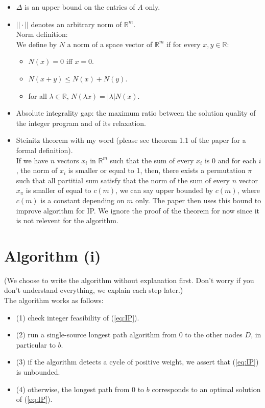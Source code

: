 \documentclass[12pt]{article}
\theoremstyle{definition}
\begin{document}
\begin{itemize}
	\item $\Delta$ is an upper bound on the entries of $A$ only.
	\item $|| \cdot ||$ denotes an arbitrary norm of $\mathbb{R}^m$. \\
	Norm definition: \\
	We define by $N$ a norm of a space vector of $\mathbb{R}^m$ if for every $x, y \in \mathbb{R}$:
	
	\begin{itemize}
		\item $N(x) = 0$ iff $x=0$.
		\item $N(x+y) \leq N(x) + N(y)$.
		\item for all $\lambda \in \mathbb{R}$, $N(\lambda x) = |\lambda|N(x)$.
	\end{itemize} 
	\item Absolute integrality gap: the maximum ratio between the solution quality of the integer program and of its relaxation.
	\item Steinitz theorem with my word (please see theorem 1.1 of the paper for a formal definition). \\
	If we have $n$ vectors $x_i$ in $\mathbb{R}^m$ such that the sum of every $x_i$ is 0 and for each $i$, the  norm of $x_i$ is smaller or equal to 1, then, there exists a permutation $\pi$ such that all partitial sum satisfy that the norm of the sum of every $n$ vector $x_{\pi}$ is smaller of equal to $c(m)$, we can say upper bounded by $c(m)$, where $c(m)$ is a constant depending on $m$ only. The paper then uses this bound to improve algorithm for IP. We ignore the proof of the theorem for now since it is not relevent for the algorithm.
\end{itemize}

\section{Algorithm (i)}

(We choose to write the algorithm without explanation first. Don't worry if you don't understand everything, we explain each step later.) \\
The algorithm works as follows:

\begin{itemize}
	\item (1) check integer feasibility of (\ref{eq:IP}).
	\item (2) run a single-source longest path algorithm from $0$ to the other nodes $D$, in particular to $b$.
	\item (3) if the algorithm detects a cycle of positive weight, we assert that (\ref{eq:IP}) is unbounded.
	\item (4) otherwise, the longest path from $0$ to $b$ corresponds to an optimal solution of (\ref{eq:IP}).
\end{itemize}
\end{document}
